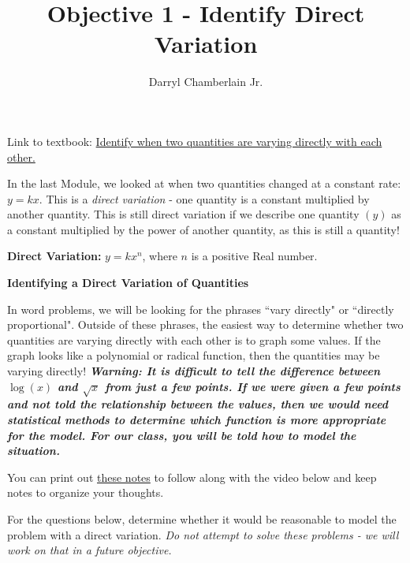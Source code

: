 \documentclass{ximera}
\author{Darryl Chamberlain Jr.}
\title{Objective 1 - Identify Direct Variation}
\begin{document}
\begin{abstract}

\end{abstract}

\maketitle
 
Link to textbook: 
\href{https://cnx.org/contents/mwjClAV_@8.12:yUH0hROr@12/Modeling-Using-Variation}{Identify when two quantities are varying directly with each other.}
 

In the last Module, we looked at when two quantities changed at a constant rate: $y=kx$. This is a \textit{direct variation} - one quantity is a constant multiplied by another quantity. This is still direct variation if we describe one quantity $(y)$ as a constant multiplied by the power of another quantity, as this is still a quantity! 

\textbf{Direct Variation:} $y = k x^n$, where $n$ is a positive Real number. 

\textbf{Identifying a Direct Variation of Quantities}

In word problems, we will be looking for the phrases ``vary directly" or ``directly proportional". Outside of these phrases, the easiest way to determine whether two quantities are varying directly with each other is to graph some values. If the graph looks like a polynomial or radical function, then the quantities may be varying directly! \textbf{\textit{Warning: It is difficult to tell the difference between $\log{(x)}$ and $\sqrt{x}$ from just a few points. If we were given a few points and not told the relationship between the values, then we would need statistical methods to determine which function is more appropriate for the model. For our class, you will be told how to model the situation.}} 

You can print out \href{http://people.clas.ufl.edu/dchamberlain31/files/M10M-Objective-1-Identify-Direct-Variation.pdf}{these notes} to follow along with the video below and keep notes to organize your thoughts.


For the questions below, determine whether it would be reasonable to model the problem with a direct variation. \textit{Do not attempt to solve these problems - we will work on that in a future objective.}
\end{document}
